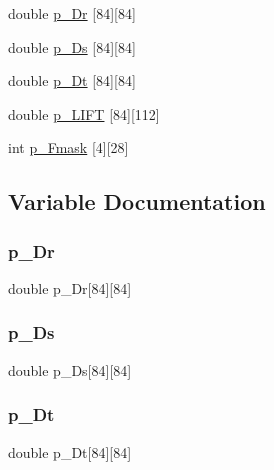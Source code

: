 \begin{DoxyCompactItemize}
\item 
double \hyperlink{a00494_ab5e25c19b2818478eb316f9a56506e57}{p\+\_\+\+Dr} \mbox{[}84\mbox{]}\mbox{[}84\mbox{]}
\item 
double \hyperlink{a00494_ab928c8a0ebd315681bd91070e2b036ee}{p\+\_\+\+Ds} \mbox{[}84\mbox{]}\mbox{[}84\mbox{]}
\item 
double \hyperlink{a00494_a4e5d87f83d74b6e4677fcb6c67d2e7be}{p\+\_\+\+Dt} \mbox{[}84\mbox{]}\mbox{[}84\mbox{]}
\item 
double \hyperlink{a00494_a432c0a87f7f3f25d8b292fc3b5a76562}{p\+\_\+\+L\+I\+FT} \mbox{[}84\mbox{]}\mbox{[}112\mbox{]}
\item 
int \hyperlink{a00494_ab30e3bffa73b672b31748c5267d04f6c}{p\+\_\+\+Fmask} \mbox{[}4\mbox{]}\mbox{[}28\mbox{]}
\end{DoxyCompactItemize}


\subsection{Variable Documentation}
\mbox{\label{a00494_ab5e25c19b2818478eb316f9a56506e57}} 
\subsubsection{\texorpdfstring{p\+\_\+\+Dr}{p\_Dr}}
{\footnotesize\ttfamily double p\+\_\+\+Dr\mbox{[}84\mbox{]}\mbox{[}84\mbox{]}}

\mbox{\label{a00494_ab928c8a0ebd315681bd91070e2b036ee}} 
\subsubsection{\texorpdfstring{p\+\_\+\+Ds}{p\_Ds}}
{\footnotesize\ttfamily double p\+\_\+\+Ds\mbox{[}84\mbox{]}\mbox{[}84\mbox{]}}

\mbox{\label{a00494_a4e5d87f83d74b6e4677fcb6c67d2e7be}} 
\subsubsection{\texorpdfstring{p\+\_\+\+Dt}{p\_Dt}}
{\footnotesize\ttfamily double p\+\_\+\+Dt\mbox{[}84\mbox{]}\mbox{[}84\mbox{]}}

